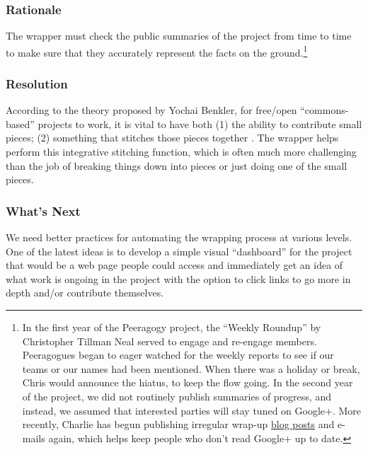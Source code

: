 \subsubsection*{Rationale}
The wrapper must check the public summaries of the project from time to time to make sure that they accurately represent the facts on the ground.\footnote{In the first year of the Peeragogy project, the ``Weekly Roundup'' by Christopher Tillman Neal served to engage and re-engage members. Peeragogues began to eager watched for the weekly reports to see if our teams or our names had been mentioned. When there was a holiday or break, Chris would announce the hiatus, to keep the flow going. In the second year of the project, we did not routinely publish summaries of progress, and instead, we assumed that interested parties will stay tuned on Google+.  More recently, Charlie has begun publishing irregular wrap-up \href{http://peeragogy.org/peeragogy-wrapper-post-9-feb-5-apr-2015/}{blog posts} and e-mails again, which helps keep people who don't read Google+ up to date.}

\subsubsection*{Resolution} 
According to the theory proposed by Yochai Benkler, for free/open ``commons-based'' projects to work, it is vital to have both (1) the ability to contribute small pieces; (2) something that stitches those pieces together \cite{coases-penguin}. The wrapper helps perform this integrative stitching function, which is often much more challenging than the job of breaking things down into pieces or just doing one of the small pieces.

\subsubsection*{What's Next}
We need better practices for automating the wrapping process at various levels. One of the latest ideas is to develop a simple visual ``dashboard'' for the project that would be a web page people could access and immediately get an idea of what work is ongoing in the project with the option to click links to go more in depth and/or contribute themselves.



